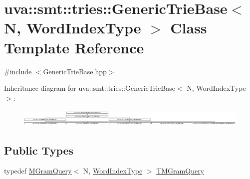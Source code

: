 \hypertarget{classuva_1_1smt_1_1tries_1_1_generic_trie_base}{}\section{uva\+:\+:smt\+:\+:tries\+:\+:Generic\+Trie\+Base$<$ N, Word\+Index\+Type $>$ Class Template Reference}
\label{classuva_1_1smt_1_1tries_1_1_generic_trie_base}


{\ttfamily \#include $<$Generic\+Trie\+Base.\+hpp$>$}

Inheritance diagram for uva\+:\+:smt\+:\+:tries\+:\+:Generic\+Trie\+Base$<$ N, Word\+Index\+Type $>$\+:\begin{figure}[H]
\begin{center}
\leavevmode
\includegraphics[height=0.856597cm]{classuva_1_1smt_1_1tries_1_1_generic_trie_base}
\end{center}
\end{figure}
\subsection*{Public Types}
\begin{DoxyCompactItemize}
\item 
typedef \hyperlink{structuva_1_1smt_1_1tries_1_1_m_gram_query}{M\+Gram\+Query}$<$ N, \hyperlink{classuva_1_1smt_1_1tries_1_1_word_index_trie_base_a30c4fffe3a3423c87b229b66340dd2f8}{Word\+Index\+Type} $>$ \hyperlink{classuva_1_1smt_1_1tries_1_1_generic_trie_base_a53a71f408bedf42ba24a566842bf3785}{T\+M\+Gram\+Query}
\end{DoxyCompactItemize}
